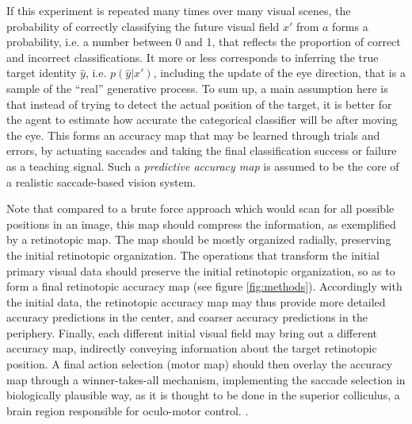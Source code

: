 If this experiment is repeated many times over many visual scenes, the probability of correctly classifying the future visual field $x'$ from $a$ forms a probability, i.e. a number between 0 and 1, that reflects the proportion of correct and incorrect classifications.
\ICANN It more or less corresponds to inferring the true target identity $\hat{y}$, i.e. $p(\hat{y}|x')$, including the update of the eye direction, that is a sample of the ``real'' generative process.\fi
{}\ICANN
To sum up, a main assumption here is that instead of trying to detect the actual position of the target, it is better for the agent to estimate how accurate the categorical classifier will be after moving the eye. This forms an accuracy map that may be learned through trials and errors, by actuating saccades %
and taking the final classification success or failure as a teaching signal.\fi
Such a \emph{predictive accuracy map} is assumed to be the core of a realistic saccade-based vision system.

\ICANN Note that compared to a brute force approach which would scan for all possible positions in an image, this map should compress the information, as exemplified by a retinotopic map. The map should be mostly organized radially, preserving the initial retinotopic organization. %
\fi
The operations that transform the initial primary visual data should  preserve the initial retinotopic organization, so as to form a final  retinotopic accuracy map (see figure \ref{fig:methods}). Accordingly with the initial data, the retinotopic accuracy map may thus provide more detailed accuracy predictions in the center, and coarser accuracy predictions in the periphery. 
Finally, each different initial visual field may bring out a different accuracy map, indirectly conveying information about the target retinotopic position. 
A final action selection (motor map) should then overlay the accuracy map through a winner-takes-all mechanism, implementing the saccade selection in biologically plausible way, as it is thought to be done in the superior colliculus, a brain region responsible for oculo-motor control\ICANN .
.

